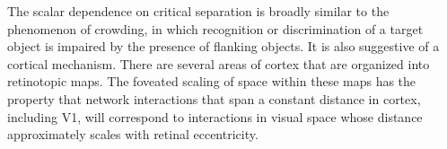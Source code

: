 \documentclass[../manuscript.tex]{subfiles}
\def\biblio{}
\begin{document}
The scalar dependence on critical separation is broadly similar to the phenomenon of crowding, in which recognition or discrimination of a target object is impaired by the presence of flanking objects.  It is also suggestive of a cortical mechanism. There are several areas of cortex that are organized into retinotopic maps. The foveated scaling of space within these maps has the property that network interactions that span a constant distance in cortex, including V1, will correspond to interactions in visual space whose distance approximately scales with retinal eccentricity. 

\biblio
\end{document}
